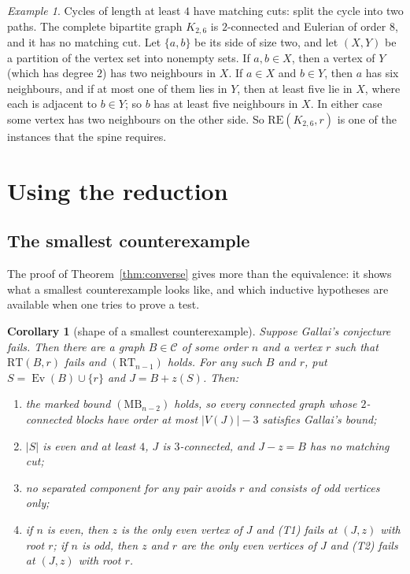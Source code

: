 \documentclass[11pt]{amsart}
\newtheorem{corollary}[theorem]{Corollary}
\theoremstyle{definition}
\theoremstyle{remark}
\newtheorem{example}[theorem]{Example}
\renewcommand{\_}{\oldunderscore\allowbreak}
\newcommand{\cC}{\mathcal{C}}
\newcommand{\MBU}{\mathrm{MB}}
\newcommand{\RT}{\mathrm{RT}}
\newcommand{\Ev}{\operatorname{Ev}}
\newcommand{\RE}{\mathrm{RE}}
\begin{document}
\begin{example}\label{ex:K26}
Cycles of length at least $4$ have matching cuts: split the cycle into two paths. The complete
bipartite graph $K_{2,6}$ is $2$-connected and Eulerian of order $8$, and it has no matching cut. Let
$\{a,b\}$ be its side of size two, and let $(X,Y)$ be a partition of the vertex set into nonempty
sets. If $a,b\in X$, then a vertex of $Y$ (which has degree $2$) has two neighbours in $X$. If
$a\in X$ and $b\in Y$, then $a$ has six neighbours, and if at most one of them lies in $Y$, then at
least five lie in $X$, where each is adjacent to $b\in Y$; so $b$ has at least five neighbours in
$X$. In either case some vertex has two neighbours on the other side. So $\RE(K_{2,6},r)$ is one
of the instances that the spine requires.
\end{example}

\section{Using the reduction}\label{sec:use}

\subsection*{The smallest counterexample}
The proof of Theorem~\ref{thm:converse} gives more than the equivalence: it shows what a smallest
counterexample looks like, and which inductive hypotheses are available when one tries to prove a
test.

\begin{corollary}[shape of a smallest counterexample]\label{cor:mincex}
Suppose Gallai's conjecture fails. Then there are a graph $B\in\cC$ of some order $n$ and a vertex
$r$ such that $\RT(B,r)$ fails and $(\RT_{n-1})$ holds. For any such $B$ and $r$, put
$S=\Ev(B)\cup\{r\}$ and $J=B+z(S)$. Then:
\begin{enumerate}[label=\textup{(\alph*)}]
\item the marked bound $(\MBU_{n-2})$ holds, so every connected graph whose $2$-connected blocks have
order at most $|V(J)|-3$ satisfies Gallai's bound;
\item $|S|$ is even and at least $4$, $J$ is $3$-connected, and $J-z=B$ has no matching cut;
\item no separated component for any pair avoids $r$ and consists of odd vertices only;
\item if $n$ is even, then $z$ is the only even vertex of $J$ and \textup{(T1)} fails at $(J,z)$
with root $r$; if $n$ is odd, then $z$ and $r$ are the only even vertices of $J$ and \textup{(T2)}
fails at $(J,z)$ with root $r$.
\end{enumerate}
\end{corollary}
\end{document}

